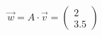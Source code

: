 \documentclass[preview]{standalone}
\begin{document}
\begin{align*}
\vec{w} = A \cdot \vec{v} = \begin{pmatrix} 2 \\ 3.5 \end{pmatrix}
\end{align*}
\end{document}
